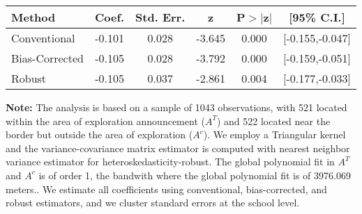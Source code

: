 \begin{table}[htbp]\centering
 \footnotesize 
\begin{tabular}{lccccc}
\hline\hline
Method & Coef. & Std. Err. & z & P$>|$z$|$ & [95\% C.I.] \\ 
\hline \hline  
Conventional & -0.101 & 0.028 & -3.645 & 0.000 & [-0.155,-0.047] \\ 
 Bias-Corrected & -0.105 & 0.028 & -3.792 & 0.000 & [-0.159,-0.051] \\ 
Robust & -0.105 & 0.037 & -2.861 & 0.004 & [-0.177,-0.033] \\ 
  \hline\hline
\end{tabular}
\label{table:rd}
\begin{tablenotes} 
  \justifying \tiny \textbf{Note: }    
   The analysis is based on a sample of 1043 observations, with 521 located within the area of exploration announcement ($A^{T}$) and 522 located near the border but outside the area of exploration  ($A^{c}$). 
           We employ a Triangular kernel and the variance-covariance matrix estimator is computed with nearest neighbor variance estimator for heteroskedasticity-robust. The global polynomial fit in  $A^{T}$ and $A^{c}$ is of order 1, the bandwith where the global polynomial fit is of 3976.069 meters.. We estimate all coefficients using conventional, bias-corrected, and robust estimators, and we cluster standard errors at the school level. \end{tablenotes} 
 \end{table} 
